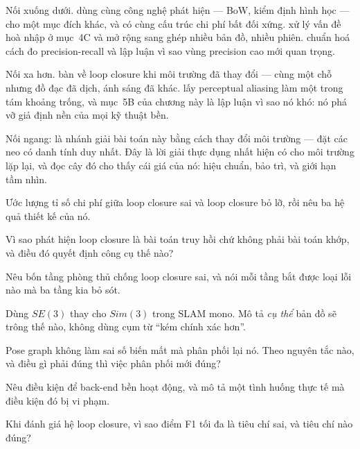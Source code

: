 \documentclass[../../vslam.tex]{subfiles}
\begin{document}
Nối xuống dưới.  dùng cùng công nghệ phát hiện --- BoW, kiểm định hình học --- cho một mục đích khác, và có cùng cấu trúc chi phí bất đối xứng.  xử lý vấn đề hoà nhập ở mục~4C và mở rộng sang ghép nhiều bản đồ, nhiều phiên.  chuẩn hoá cách đo precision-recall và lập luận vì sao vùng precision cao mới quan trọng.

Nối xa hơn.  bàn về loop closure khi môi trường đã thay đổi --- cùng một chỗ nhưng đồ đạc đã dịch, ánh sáng đã khác.  lấy perceptual aliasing làm một trong tám khoảng trống, và mục~5B của chương này là lập luận vì sao nó khó: nó phá vỡ giả định nền của mọi kỹ thuật bền.

Nối ngang:  là nhánh giải bài toán này bằng cách thay đổi môi trường --- đặt các neo có danh tính duy nhất. Đây là lời giải thực dụng nhất hiện có cho môi trường lặp lại, và đọc cây đó cho thấy cái giá của nó: hiệu chuẩn, bảo trì, và giới hạn tầm nhìn.

\begin{tukiem}
\item Ước lượng tỉ số chi phí giữa loop closure sai và loop closure bỏ lỡ, rồi nêu ba hệ quả thiết kế của nó.
\item Vì sao phát hiện loop closure là bài toán truy hồi chứ không phải bài toán khớp, và điều đó quyết định công cụ thế nào?
\item Nêu bốn tầng phòng thủ chống loop closure sai, và nói mỗi tầng bắt được loại lỗi nào mà ba tầng kia bỏ sót.
\item Dùng \(SE(3)\) thay cho \(Sim(3)\) trong SLAM mono. Mô tả \emph{cụ thể} bản đồ sẽ trông thế nào, không dùng cụm từ ``kém chính xác hơn''.
\item Pose graph không làm sai số biến mất mà phân phối lại nó. Theo nguyên tắc nào, và điều gì phải đúng thì việc phân phối mới đúng?
\item Nêu điều kiện để back-end bền hoạt động, và mô tả một tình huống thực tế mà điều kiện đó bị vi phạm.
\item Khi đánh giá hệ loop closure, vì sao điểm F1 tối đa là tiêu chí sai, và tiêu chí nào đúng?
\end{tukiem}
\ifSubfilesClassLoaded{\printbibliography[title={Nguồn}]}{}
\end{document}

